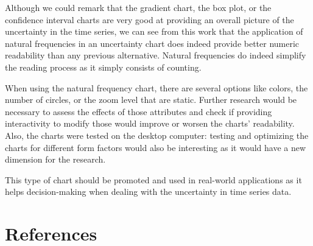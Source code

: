 \documentclass[a4paper,3p,sort&compress]{elsarticle}
\begin{document}
Although we could remark that the gradient chart, the box plot, or the confidence interval charts are very good at 
providing an overall picture of the uncertainty in the time series, we can see from this work that the application of natural 
frequencies in an uncertainty chart does indeed
provide better numeric readability than any previous alternative. Natural frequencies do indeed simplify 
the reading process as it simply consists of counting.

When using the natural frequency chart, there are several options like colors, the number of circles, or the 
zoom level that are static. Further research would be necessary to assess the effects of those 
attributes and check if providing interactivity to modify those would improve or worsen the charts' readability. 
Also, the charts were tested on the desktop computer: testing and optimizing the charts for different form factors
would also be interesting as it would have a new dimension for the research.

This type of chart should be promoted and used in real-world applications as it helps decision-making when 
dealing with the uncertainty in time series data. 

\section{References}
\label{sec:ref}



\end{document}
